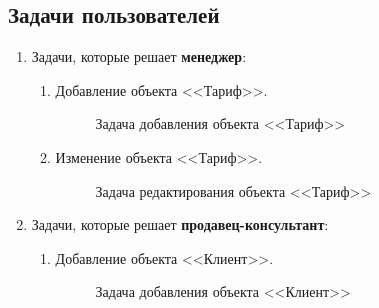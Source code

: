 \subsection{Задачи пользователей}\label{user-problems}


\begin{enumerate}
    \item Задачи, которые решает \textbf{менеджер}:
    \begin{enumerate}
        \item Добавление объекта <<Тариф>>.
        \begin{figure}[H]
            \label{fig:tariff-adding-task}
            \caption{Задача добавления объекта <<Тариф>>}
        \end{figure}
        
        \item Изменение объекта <<Тариф>>.
        \begin{figure}[H]
            \label{fig:tariff-editing-task}
            \caption{Задача редактирования объекта <<Тариф>>}
        \end{figure}
    \end{enumerate}

    \item Задачи, которые решает \textbf{продавец-консультант}:
    \begin{enumerate}
        \item Добавление объекта <<Клиент>>.
        \begin{figure}[H]
            \label{fig:client-adding-task}
            \caption{Задача добавления объекта <<Клиент>>}
        \end{figure}


\end{enumerate}
\end{enumerate}
